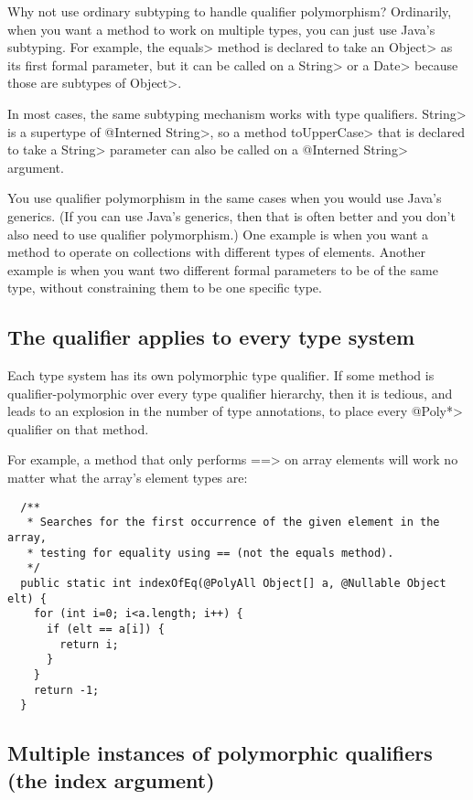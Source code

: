 Why not use ordinary subtyping to handle qualifier polymorphism?
Ordinarily, when you want a method to work on multiple types, you can just
use Java's subtyping.  For example, the \<equals> method is declared to
take an \<Object> as its first formal parameter, but it can be called on a
\<String> or a \<Date> because those are subtypes of \<Object>.

In most cases, the same subtyping mechanism works with type qualifiers.
\<String> is a supertype of \<@Interned String>, so a method \<toUpperCase>
that is declared to take a \<String> parameter can also be called on a
\<@Interned String> argument.

You use qualifier polymorphism in the same cases when you would use Java's
generics.  (If you can use Java's generics, then that is often better and
you don't also need to use qualifier polymorphism.)  One example is when
you want a method to operate on collections with different types of
elements.  Another example is when you want two different formal parameters
to be of the same type, without constraining them to be one specific type.


\subsection{The  qualifier applies to every type system\label{polyall}}

Each type system has its own polymorphic type qualifier.
If some method is qualifier-polymorphic over every type qualifier
hierarchy, then it is tedious, and leads to an explosion in the number of
type annotations, to place every \<@Poly*> qualifier on that method.

For example, a method that only performs \<==> on array elements will work
no matter what the array's element types are:

\begin{Verbatim}
  /**
   * Searches for the first occurrence of the given element in the array,
   * testing for equality using == (not the equals method).
   */
  public static int indexOfEq(@PolyAll Object[] a, @Nullable Object elt) {
    for (int i=0; i<a.length; i++) {
      if (elt == a[i]) {
        return i;
      }
    }
    return -1;
  }
\end{Verbatim}


\subsection{Multiple instances of polymorphic qualifiers (the index argument)\label{qualifier-polymorphism-multiple-instances}}


